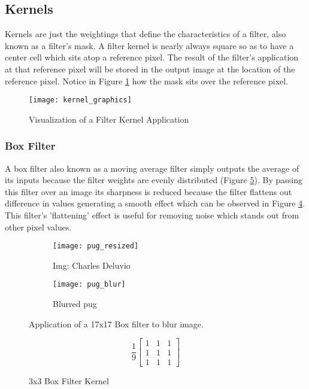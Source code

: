 \subsection{Kernels}
\label{subsection:kernels}
Kernels are just the weightings that define the characteristics of a filter, also known as a filter's mask. A filter kernel is nearly always square so as to have a center cell which sits atop a reference pixel. The result of the filter's application at that reference pixel will be stored in the output image at the location of the reference pixel. Notice in Figure \ref{fig:kernel_graphics} how the mask sits over the reference pixel.

\begin{figure}[H]
 \centering
 \centering\texttt{[image: kernel\_graphics]}
 \caption{Visualization of a Filter Kernel Application}
 \label{fig:kernel_graphics}
\end{figure}

\subsubsection{Box Filter}
\label{subsubsection:boxfilter}
A box filter also known as a moving average filter simply outputs the average of its inputs because the filter weights are evenly distributed (Figure \ref{fig:box_kernel}). By passing this filter over an image its sharpness is reduced because the filter flattens out difference in values generating a smooth effect which can be observed in Figure \ref{fig:pug_blur}. This filter's 'flattening' effect is useful for removing noise which stands out from other pixel values.


\begin{figure}[H]
    \centering
    \begin{subfigure}[b]{0.3\textwidth}
        \texttt{[image: pug\_resized]}
        \caption{Img: Charles Deluvio}
        \label{fig:pug_noise}
    \end{subfigure}
    \begin{subfigure}[b]{0.3\textwidth}
        \texttt{[image: pug\_blur]}
        \caption{Blurred pug}
        \label{fig:pug_denoised}
    \end{subfigure}
    \caption{Application of a 17x17 Box filter to blur image.}
    \label{fig:pug_blur}
\end{figure}

\begin{figure}[H]
   \centering
   \[
     \frac{1}{9}
   \begin{bmatrix}
      1 & 1 & 1 \\
      1 & 1 & 1 \\
      1 & 1 & 1
   \end{bmatrix}
   \]
   \caption{3x3 Box Filter Kernel}
   \label{fig:box_kernel}
\end{figure}

